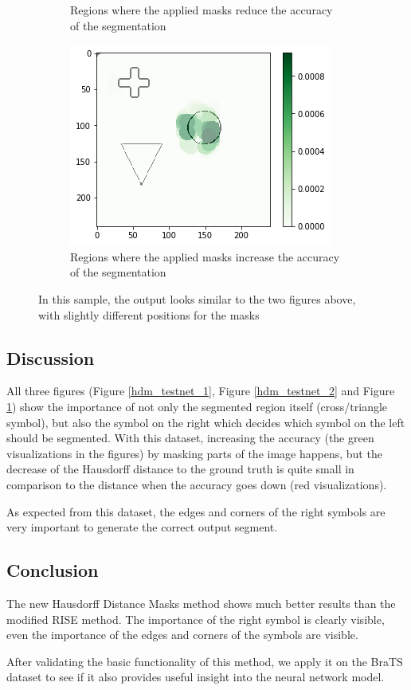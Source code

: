\begin{figure}[H]
\begin{subfigure}[t]{.34\textwidth}
        \caption{Regions where the applied masks reduce the accuracy of the segmentation}
    \end{subfigure}\hfill%
    \begin{subfigure}[t]{.34\textwidth}
        \centering
        \includegraphics[width=\linewidth]{chapters/06_hdm/testnet/11.png}
        \caption{Regions where the applied masks increase the accuracy of the segmentation}
    \end{subfigure}
    \caption{In this sample, the output looks similar to the two figures above, with slightly different positions for the masks}
    \label{hdm_testnet_3}
\end{figure}

\subsection{Discussion}
All three figures (Figure \ref{hdm_testnet_1}, Figure \ref{hdm_testnet_2} and Figure \ref{hdm_testnet_3}) show the importance of not only the segmented region itself (cross/triangle symbol), but also the symbol on the right which decides which symbol on the left should be segmented. With this dataset, increasing the accuracy (the green visualizations in the figures) by masking parts of the image happens, but the decrease of the Hausdorff distance to the ground truth is quite small in comparison to the distance when the accuracy goes down (red visualizations).

As expected from this dataset, the edges and corners of the right symbols are very important to generate the correct output segment.

\subsection{Conclusion}
The new Hausdorff Distance Masks method shows much better results than the modified RISE method. The importance of the right symbol is clearly visible, even the importance of the edges and corners of the symbols are visible.

After validating the basic functionality of this method, we apply it on the BraTS dataset to see if it also provides useful insight into the neural network model.
